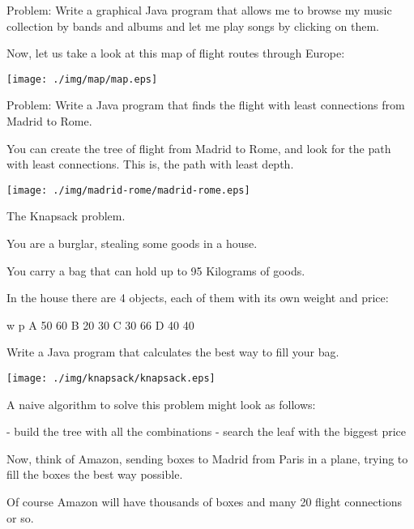 \documentclass[a4paper, 9pt]{extarticle}
\newcommand{\separator}{\begin{center}%
\noindent\makebox[\linewidth]{\rule{0.75\paperwidth}{0.4pt}}%
\end{center}}
\begin{document}
Problem: Write a graphical Java program that allows me to browse my music collection
by bands and albums and let me play songs by clicking on them.

\separator

Now, let us take a look at this map of flight routes through Europe:

\begin{center}
\texttt{[image: ./img/map/map.eps]}
\end{center}

Problem: Write a Java program that finds the flight with least connections from Madrid to Rome.

You can create the tree of flight from Madrid to Rome, and look for the path
with least connections. This is, the path with least depth.

\begin{center}
\texttt{[image: ./img/madrid-rome/madrid-rome.eps]}
\end{center}

\separator

The Knapsack problem.

You are a burglar, stealing some goods in a house.

You carry a bag that can hold up to 95 Kilograms of goods.

\newpage

In the house there are 4 objects, each of them with its own weight and price:

\begin{blackboard}
      w  p
  A  50 60
  B  20 30
  C  30 66
  D  40 40
\end{blackboard}

Write a Java program that calculates the best way to fill your bag.

\begin{center}
\texttt{[image: ./img/knapsack/knapsack.eps]}
\end{center}

A naive algorithm to solve this problem might look as follows:

\begin{blackboard}
  - build the tree with all the combinations
  - search the leaf with the biggest price
\end{blackboard}

Now, think of Amazon, sending boxes to Madrid from Paris in a plane, trying to
fill the boxes the best way possible.

Of course Amazon will have thousands of boxes and many 20 flight connections or so.
\end{document}
